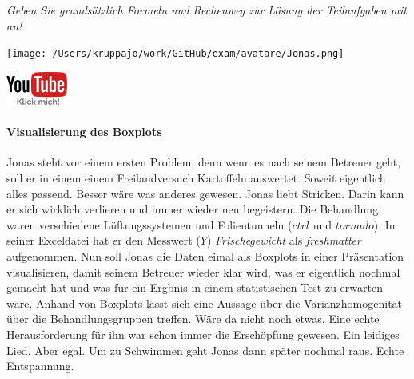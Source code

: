 \documentclass[a4paper, 9pt]{scrartcl}\usepackage[]{graphicx}\usepackage[]{xcolor}
\begin{document}
\textit{Geben Sie grundsätzlich Formeln und Rechenweg zur Lösung der Teilaufgaben mit an!} \\[1Ex]
 

 
\begin{minipage}[t]{0.5\textwidth}
\texttt{[image: /Users/kruppajo/work/GitHub/exam/avatare/Jonas.png]}
\end{minipage}
\begin{minipage}[t]{0.5\textwidth}
\hfill
\href{https://youtu.be/0xc0jIPeiyw}{\includegraphics[width = 2cm]{img/youtube}}
\end{minipage}
\vspace{-3ex}



\paragraph{Visualisierung des Boxplots}

Jonas steht vor einem ersten Problem, denn wenn es nach seinem Betreuer geht, soll er in einem einem Freilandversuch Kartoffeln auswertet. Soweit eigentlich alles passend. Besser wäre was anderes gewesen. Jonas liebt Stricken. Darin kann er sich wirklich verlieren und immer wieder neu begeistern. Die Behandlung waren verschiedene Lüftungssystemen und Folientunneln ($ctrl$ und $tornado$). In seiner Exceldatei hat er den Messwert ($Y$) \textit{Frischegewicht} als \textit{freshmatter} aufgenommen. Nun soll Jonas die Daten eimal als Boxplots in einer Präsentation visualisieren, damit seinem Betreuer wieder klar wird, was er eigentlich nochmal gemacht hat und was für ein Ergbnis in einem statistischen Test zu erwarten wäre. Anhand von Boxplots lässt sich eine Aussage über die Varianzhomogenität über die Behandlungsgruppen treffen. Wäre da nicht noch etwas. Eine echte Herausforderung für ihn war schon immer die Erschöpfung gewesen. Ein leidiges Lied. Aber egal. Um zu Schwimmen geht Jonas dann später nochmal raus. Echte Entspannung.
\end{document}
